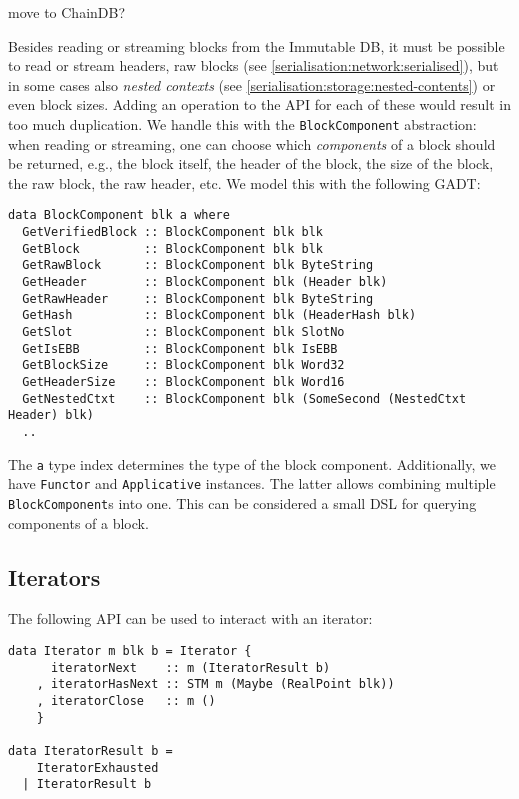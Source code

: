  move to ChainDB?

Besides reading or streaming blocks from the Immutable DB, it must be possible
to read or stream headers, raw blocks (see
\cref{serialisation:network:serialised}), but in some cases also \emph{nested
contexts} (see \cref{serialisation:storage:nested-contents}) or even block
sizes. Adding an operation to the API for each of these would result in too much
duplication. We handle this with the \lstinline!BlockComponent! abstraction:
when reading or streaming, one can choose which \emph{components} of a block
should be returned, e.g., the block itself, the header of the block, the size of
the block, the raw block, the raw header, etc. We model this with the following
GADT:

\begin{lstlisting}
data BlockComponent blk a where
  GetVerifiedBlock :: BlockComponent blk blk
  GetBlock         :: BlockComponent blk blk
  GetRawBlock      :: BlockComponent blk ByteString
  GetHeader        :: BlockComponent blk (Header blk)
  GetRawHeader     :: BlockComponent blk ByteString
  GetHash          :: BlockComponent blk (HeaderHash blk)
  GetSlot          :: BlockComponent blk SlotNo
  GetIsEBB         :: BlockComponent blk IsEBB
  GetBlockSize     :: BlockComponent blk Word32
  GetHeaderSize    :: BlockComponent blk Word16
  GetNestedCtxt    :: BlockComponent blk (SomeSecond (NestedCtxt Header) blk)
  ..
\end{lstlisting}
The \lstinline!a! type index determines the type of the block component.
Additionally, we have \lstinline!Functor! and \lstinline!Applicative! instances.
The latter allows combining multiple \lstinline!BlockComponent!s into one. This
can be considered a small DSL for querying components of a block.

\subsection{Iterators}
\label{immutable:api:iterators}

The following API can be used to interact with an iterator:

\begin{lstlisting}
data Iterator m blk b = Iterator {
      iteratorNext    :: m (IteratorResult b)
    , iteratorHasNext :: STM m (Maybe (RealPoint blk))
    , iteratorClose   :: m ()
    }

data IteratorResult b =
    IteratorExhausted
  | IteratorResult b
\end{lstlisting}


